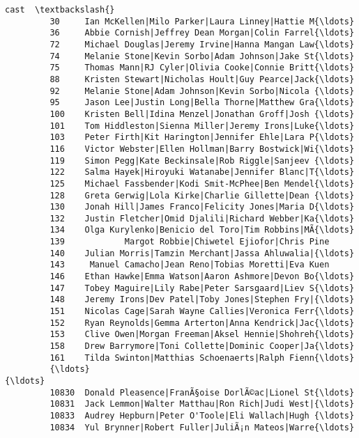 \documentclass[11pt]{article}
\begin{document}
\begin{Verbatim}[commandchars=\\\{\}]
                                                             cast  \textbackslash{}
         30     Ian McKellen|Milo Parker|Laura Linney|Hattie M{\ldots}   
         36     Abbie Cornish|Jeffrey Dean Morgan|Colin Farrel{\ldots}   
         72     Michael Douglas|Jeremy Irvine|Hanna Mangan Law{\ldots}   
         74     Melanie Stone|Kevin Sorbo|Adam Johnson|Jake St{\ldots}   
         75     Thomas Mann|RJ Cyler|Olivia Cooke|Connie Britt{\ldots}   
         88     Kristen Stewart|Nicholas Hoult|Guy Pearce|Jack{\ldots}   
         92     Melanie Stone|Adam Johnson|Kevin Sorbo|Nicola {\ldots}   
         95     Jason Lee|Justin Long|Bella Thorne|Matthew Gra{\ldots}   
         100    Kristen Bell|Idina Menzel|Jonathan Groff|Josh {\ldots}   
         101    Tom Hiddleston|Sienna Miller|Jeremy Irons|Luke{\ldots}   
         103    Peter Firth|Kit Harington|Jennifer Ehle|Lara P{\ldots}   
         116    Victor Webster|Ellen Hollman|Barry Bostwick|Wi{\ldots}   
         119    Simon Pegg|Kate Beckinsale|Rob Riggle|Sanjeev {\ldots}   
         122    Salma Hayek|Hiroyuki Watanabe|Jennifer Blanc|T{\ldots}   
         125    Michael Fassbender|Kodi Smit-McPhee|Ben Mendel{\ldots}   
         128    Greta Gerwig|Lola Kirke|Charlie Gillette|Dean {\ldots}   
         130    Jonah Hill|James Franco|Felicity Jones|Maria D{\ldots}   
         132    Justin Fletcher|Omid Djalili|Richard Webber|Ka{\ldots}   
         134    Olga Kurylenko|Benicio del Toro|Tim Robbins|MÃ{\ldots}   
         139            Margot Robbie|Chiwetel Ejiofor|Chris Pine   
         140    Julian Morris|Tamzin Merchant|Jassa Ahluwalia|{\ldots}   
         143     Manuel Camacho|Jean Reno|Tobias Moretti|Eva Kuen   
         146    Ethan Hawke|Emma Watson|Aaron Ashmore|Devon Bo{\ldots}   
         147    Tobey Maguire|Lily Rabe|Peter Sarsgaard|Liev S{\ldots}   
         148    Jeremy Irons|Dev Patel|Toby Jones|Stephen Fry|{\ldots}   
         151    Nicolas Cage|Sarah Wayne Callies|Veronica Ferr{\ldots}   
         152    Ryan Reynolds|Gemma Arterton|Anna Kendrick|Jac{\ldots}   
         153    Clive Owen|Morgan Freeman|Aksel Hennie|Shohreh{\ldots}   
         158    Drew Barrymore|Toni Collette|Dominic Cooper|Ja{\ldots}   
         161    Tilda Swinton|Matthias Schoenaerts|Ralph Fienn{\ldots}   
         {\ldots}                                                  {\ldots}   
         10830  Donald Pleasence|FranÃ§oise DorlÃ©ac|Lionel St{\ldots}   
         10831  Jack Lemmon|Walter Matthau|Ron Rich|Judi West|{\ldots}   
         10833  Audrey Hepburn|Peter O'Toole|Eli Wallach|Hugh {\ldots}   
         10834  Yul Brynner|Robert Fuller|JuliÃ¡n Mateos|Warre{\ldots}   

\end{Verbatim}
\end{document}
